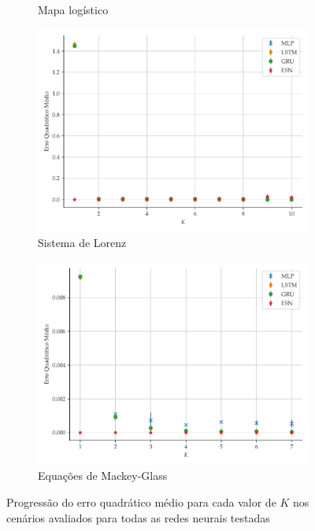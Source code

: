 \documentclass{article}
\begin{document}
\begin{figure}[H]
\begin{subfigure}[t]{0.2\textwidth}
         \caption{Mapa logístico}
     \end{subfigure}
     \centering
     \begin{subfigure}[t]{0.2\textwidth}
         \includegraphics[scale=0.2]{progressao-k-lorenz.pdf}
         \caption{Sistema de Lorenz}
     \end{subfigure}
     \centering
     \begin{subfigure}[t]{0.2\textwidth} 
         \includegraphics[scale=0.2]{progressao-k-mackeyglass.pdf}
         \caption{Equações de Mackey-Glass}
     \end{subfigure}  
     \centering   
     \caption{Progressão do erro quadrático médio para cada valor de $K$ nos cenários avaliados para todas as redes neurais testadas}
     \label{fig:mse-progression}
\end{figure}
\end{document}
